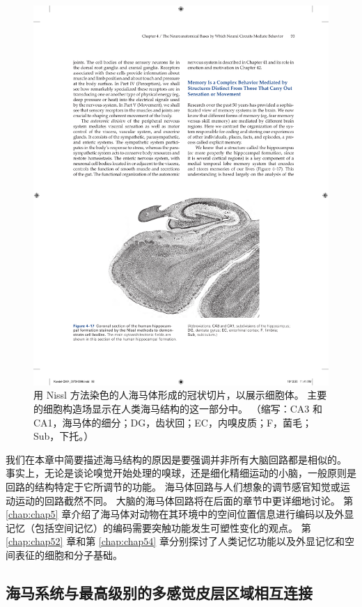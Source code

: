 \begin{figure}[htbp]
	\centering
	\includegraphics[width=1.0\linewidth]{chap04/fig_4_17}
	\caption{用 Nissl 方法染色的人海马体形成的冠状切片，以展示细胞体。 
		主要的细胞构造场显示在人类海马结构的这一部分中。 
		（缩写：CA3 和 CA1，海马体的细分；DG，齿状回；EC，内嗅皮质；F，菌毛；Sub，下托。）}
	\label{fig:4_17}
\end{figure}

我们在本章中简要描述海马结构的原因是要强调并非所有大脑回路都是相似的。 
事实上，无论是谈论嗅觉开始处理的嗅球，还是细化精细运动的小脑，一般原则是回路的结构特定于它所调节的功能。
海马体回路与人们想象的调节感官知觉或运动运动的回路截然不同。 
大脑的海马体回路将在后面的章节中更详细地讨论。 
第 \ref{chap:chap5} 章介绍了海马体对动物在其环境中的空间位置信息进行编码以及外显记忆（包括空间记忆）的编码需要突触功能发生可塑性变化的观点。 
第 \ref{chap:chap52} 章和第 \ref{chap:chap54} 章分别探讨了人类记忆功能以及外显记忆和空间表征的细胞和分子基础。

\subsection{海马系统与最高级别的多感觉皮层区域相互连接}

